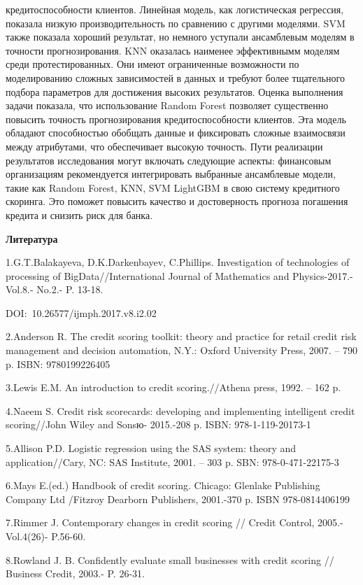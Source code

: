 кредитоспособности клиентов. Линейная модель, как логистическая
регрессия, показала низкую производительность по сравнению с другими
моделями. SVM также показала хороший результат, но немного уступали
ансамблевым моделям в точности прогнозирования. KNN оказалась наименее
эффективнымм моделям среди протестированных. Они имеют ограниченные
возможности по моделированию сложных зависимостей в данных и требуют
более тщательного подбора параметров для достижения высоких результатов.
Оценка выполнения задачи показала, что использование Random Forest
позволяет существенно повысить точность прогнозирования
кредитоспособности клиентов. Эта модель обладают способностью обобщать
данные и фиксировать сложные взаимосвязи между атрибутами, что
обеспечивает высокую точность. Пути реализации результатов исследования
могут включать следующие аспекты: финансовым организациям рекомендуется
интегрировать выбранные ансамблевые модели, такие как Random Forest,
KNN, SVM LightGBM в свою систему кредитного скоринга. Это поможет
повысить качество и достоверность прогноза погашения кредита и снизить
риск для банка.

{\bfseries Литература}

1.G.T.Balakayeva, D.K.Darkenbayev, C.Phillips. Investigation of
technologies of processing of BigData//International Journal of
Mathematics and Physics-2017.-Vol.8.- No.2.- P. 13-18.

DOI:~10.26577/ijmph.2017.v8.i2.02

2.Anderson R. The credit scoring toolkit: theory and practice for retail
credit risk management and decision automation, N.Y.: Oxford University
Press, 2007. -- 790 p. ISBN: 9780199226405

3.Lewis E.M. An introduction to credit scoring.//Athena press, 1992. --
162 p.

4.Naeem S. Credit risk scorecards: developing and implementing
intelligent credit scoring//John Wiley and Sonsю- 2015.-208 p. ISBN:
978-1-119-20173-1

5.Allison P.D. Logistic regression using the SAS system: theory and
application//Cary, NC: SAS Institute, 2001. -- 303 p. SBN:
978-0-471-22175-3

6.Mays E.(ed.) Handbook of credit scoring. Chicago: Glenlake Publishing
Company Ltd /Fitzroy Dearborn Publishers, 2001.-370 p. ISBN
978-0814406199

7.Rimmer J. Contemporary changes in credit scoring // Credit Control,
2005.-Vol.4(26)- P.56-60.

8.Rowland J. B. Confidently evaluate small businesses with credit
scoring // Business Credit, 2003.- P. 26-31.

